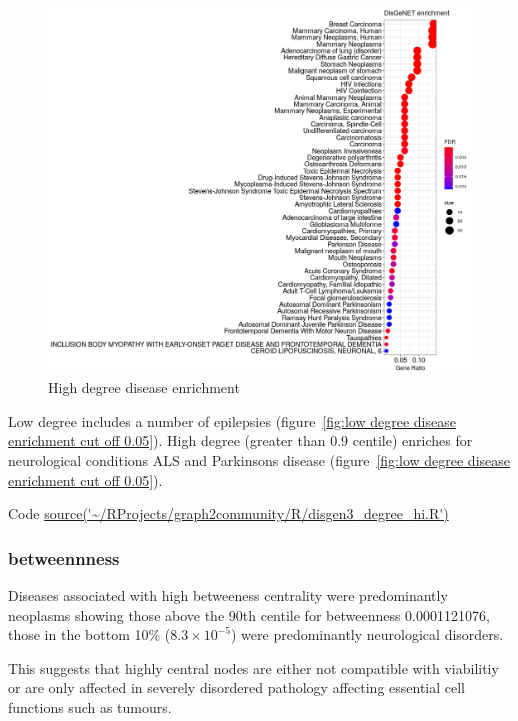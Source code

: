\begin{figure}
    \centering
    \includegraphics[width=\textwidth]{images/Rplot_high_deg_0.9_0.05cutoff_disgen.png}
    \caption{High degree disease enrichment}
    \label{fig:High degree disease enrichment cut off 0.05}
\end{figure}
Low degree includes a number of epilepsies (figure~\ref{fig:low degree disease enrichment cut off 0.05}). High degree (greater than 0.9 centile) enriches for neurological conditions ALS and Parkinsons disease (figure~\ref{fig:low degree disease enrichment cut off 0.05}).


Code \url{source('~/RProjects/graph2community/R/disgen3_degree_hi.R')}
\subsubsection{betweennness}

Diseases associated with high betweeness centrality were predominantly neoplasms showing those above the 90th centile for betweenness 0.0001121076, those in the bottom 10\% ($8.3 \times 10^{-5}$) were predominantly neurological disorders.

This suggests that highly central nodes are either not compatible with viabilitiy or are only affected in severely disordered pathology affecting essential cell functions such as tumours. 



